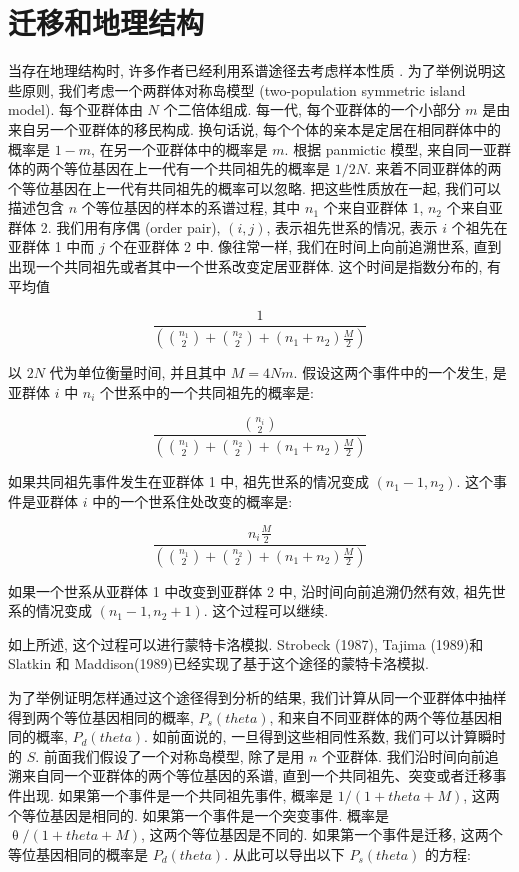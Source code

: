 \documentclass[12pt]{article}
\begin{document}
\section{迁移和地理结构}

当存在地理结构时, 许多作者已经利用系谱途径去考虑样本性质 \parencite{griffiths1981a, tajima1989}.
为了举例说明这些原则, 我们考虑一个两群体对称岛模型 (two-population symmetric
island model). 每个亚群体由 $N$ 个二倍体组成. 每一代, 每个亚群体的一个小部分 $m$ 是由来自另一个亚群体的移民构成.
换句话说, 每个个体的亲本是定居在相同群体中的概率是 $1-m$, 在另一个亚群体中的概率是 $m$. 根据 panmictic 模型,
来自同一亚群体的两个等位基因在上一代有一个共同祖先的概率是 $1/2N$.
来着不同亚群体的两个等位基因在上一代有共同祖先的概率可以忽略. 把这些性质放在一起, 我们可以描述包含 $n$
个等位基因的样本的系谱过程, 其中 $n_{1}$ 个来自亚群体 1, $n_{2}$ 个来自亚群体 2. 我们用有序偶 (order pair),
$(i,j)$, 表示祖先世系的情况, 表示 $i$ 个祖先在亚群体 1 中而 $j$ 个在亚群体 2 中. 像往常一样,
我们在时间上向前追溯世系, 直到出现一个共同祖先或者其中一个世系改变定居亚群体. 这个时间是指数分布的, 有平均值

\begin{equation*}
    \frac{1}{(\binom{n_1}{2}+\binom{n_2}{2}+(n_{1}+n_{2})\frac{M}{2})}
\end{equation*}

以 $2N$ 代为单位衡量时间, 并且其中 $M=4Nm$. 假设这两个事件中的一个发生, 是亚群体 $i$ 中 $n_{i}$
个世系中的一个共同祖先的概率是:

\begin{equation*}
    \frac{\binom{n_i}{2}}{(\binom{n_1}{2}+\binom{n_2}{2}+(n_{1}+n_{2})\frac{M}{2})}
\end{equation*}

如果共同祖先事件发生在亚群体 1 中, 祖先世系的情况变成 $(n_{1}-1,n_{2})$. 这个事件是亚群体 $i$
中的一个世系住处改变的概率是:

\begin{equation*}
    \frac{n_{i}\frac{M}{2}}{(\binom{n_1}{2} + \binom{n_2}{2} + (n_{1}+n_{2})\frac{M}{2})}
\end{equation*}

如果一个世系从亚群体 1 中改变到亚群体 2 中, 沿时间向前追溯仍然有效, 祖先世系的情况变成 $(n_{1}-1,n_{2}+1)$.
这个过程可以继续.

如上所述, 这个过程可以进行蒙特卡洛模拟. Strobeck (1987), Tajima (1989)和 Slatkin 和
Maddison(1989)已经实现了基于这个途径的蒙特卡洛模拟.

为了举例证明怎样通过这个途径得到分析的结果, 我们计算从同一个亚群体中抽样得到两个等位基因相同的概率, $P_{s}(theta )$,
和来自不同亚群体的两个等位基因相同的概率, $P_{d}(theta )$. 如前面说的, 一旦得到这些相同性系数, 我们可以计算瞬时的 $S$.
前面我们假设了一个对称岛模型, 除了是用 $n$ 个亚群体. 我们沿时间向前追溯来自同一个亚群体的两个等位基因的系谱,
直到一个共同祖先、突变或者迁移事件出现. 如果第一个事件是一个共同祖先事件, 概率是 $1/(1+theta +M)$,
这两个等位基因是相同的. 如果第一个事件是一个突变事件. 概率是 $\uptheta /(1+theta +M)$, 这两个等位基因是不同的.
如果第一个事件是迁移, 这两个等位基因相同的概率是 $P_{d}(theta )$. 从此可以导出以下 $P_{s}(theta )$ 的方程:
\end{document}
